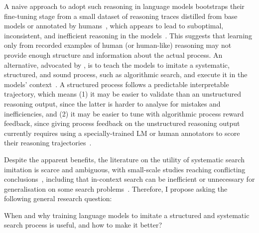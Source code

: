 A naive approach to adopt such reasoning in language models bootstraps their fine-tuning stage from a small dataset of reasoning traces distilled from base models or annotated by humans~\citep{deepseek-aiDeepSeekR1IncentivizingReasoning2025,guhaOpenThoughtsDataRecipes2025,zhangSurveyReinforcementLearning2025}, which appears to lead to suboptimal, inconsistent, and inefficient reasoning in the models~\citep{gandhiFourHabitsHighly2025,chenNOTThinkThat2025,wangThoughtsAreAll,pipisWaitWaitWait2026,arcuschinChainofThoughtReasoningWild}.
This suggests that learning only from recorded examples of human (or human-like) reasoning may not provide enough structure and information about the actual process.
An alternative, advocated by \citet{xiangSystem2Reasoning2025}, is to teach the models to imitate a systematic, structured, and sound process, such as algorithmic search, and execute it in the models' context~\citep{lehnertBetterPlanningTransformers2024,gandhiStreamSearchSoS2024,kimASTROTeachingLanguage2025}.
A structured process follows a predictable interpretable trajectory, which means (1) it may be easier to validate than an unstructured reasoning output, since the latter is harder to analyse for mistakes and inefficiencies, and (2) it may be easier to tune with algorithmic process reward feedback, since giving process feedback on the unstructured reasoning output currently requires using a specially-trained LM or human annotators to score their reasoning trajectories~\citep{uesatoSolvingMathWord2022,lightmanLetsVerifyStep2023}.

Despite the apparent benefits, the literature on the utility of systematic search imitation is scarce and ambiguous, with small-scale studies reaching conflicting conclusions~\citep{lehnertBetterPlanningTransformers2024,suDualformerControllableFast2025,saparovTransformersStruggleLearn2025,selAlgorithmThoughtsEnhancing2024,schultzMasteringBoardGames2025,kangLinTreeImprovingLLM2026,gandhiFourHabitsHighly2025,gandhiStreamSearchSoS2024,caiExtrapolationAssociationLength2025}, including that in-context search can be inefficient or unnecessary for generalisation on some search problems~\citep{qinBacktrackNotBacktrack2025,valmeekamSemanticsUnreasonableEffectiveness2025,katzThoughtSearchPlanning2024}.
Therefore, I propose asking the following general research question:

\begin{tcolorbox}[title=Thesis Question, colback=ThesisPurple!5, colframe=ThesisPurple, fonttitle=\bfseries, fontupper=\itshape]
When and why training language models to imitate a structured and systematic search process is useful, and how to make it better?
\end{tcolorbox}

